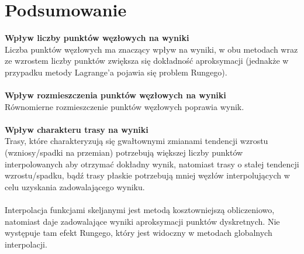 \documentclass[12pt]{extarticle}
\begin{document}
\section*{Podsumowanie}
\textbf{Wpływ liczby punktów węzłowych na wyniki}\\
Liczba punktów węzłowych ma znaczący wpływ na wyniki, w obu metodach wraz ze wzrostem liczby punktów zwiększa się dokładność aproksymacji (jednakże w przypadku metody Lagrange'a pojawia się problem Rungego).
\\ \\
\textbf{Wpływ rozmieszczenia punktów węzłowych na wyniki}\\
Równomierne rozmieszczenie punktów węzłowych poprawia wynik.
\\ \\
\textbf{Wpływ charakteru trasy na wyniki}\\
Trasy, które charakteryzują się gwałtownymi zmianami tendencji wzrostu (wzniosy/spadki na przemian) potrzebują większej liczby punktów interpolowanych aby otrzymać dokładny wynik, natomiast trasy o stałej tendencji wzrostu/spadku, bądź trasy płaskie potrzebują mniej węzłów interpolujących w celu uzyskania zadowalającego wyniku.\\ 
\\
Interpolacja funkcjami skeljanymi jest metodą kosztowniejszą obliczeniowo, natomiast daje zadowalające wyniki aproksymacji punktów dyskretnych. Nie występuje tam efekt Rungego, który jest widoczny w metodach globalnych interpolacji. 
\end{document}
